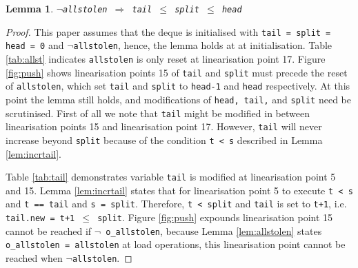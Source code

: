 \documentclass{sig-alternate-br}
\newtheorem{lemma}{Lemma}
\begin{document}
\begin{lemma}
	\texttt{$\neg$allstolen $\Rightarrow$ tail $\leq$ split $\leq$ head}
	\label{lem:allst.var}
\end{lemma}
\begin{proof}
	This paper assumes that the deque is initialised with \texttt{tail = split = head = 0} and \texttt{$\neg$allstolen}, hence, the lemma holds at at initialisation.
	Table \ref{tab:allst} indicates \texttt{allstolen} is only reset at linearisation point 17.
	Figure \ref{fig:push} shows linearisation points 15 of \texttt{tail} and \texttt{split} must precede the reset of \texttt{allstolen}, which set \texttt{tail} and \texttt{split} to \texttt{head-1} and \texttt{head} respectively.
	At this point the lemma still holds, and modifications of \texttt{head, tail,} and \texttt{split} need be scrutinised.
	First of all we note that \texttt{tail} might be modified in between linearisation points 15 and linearisation point 17.
	However, \texttt{tail} will never increase beyond \texttt{split} because of the condition \texttt{t < s} described in Lemma \ref{lem:incrtail}.
	
	Table \ref{tab:tail} demonstrates variable \texttt{tail} is modified at linearisation point 5 and 15.
	Lemma \ref{lem:incrtail} states that for linearisation point 5 to execute \texttt{t < s} and \texttt{t == tail} and \texttt{s = split}.
	Therefore, \texttt{t < split} and \texttt{tail} is set to \texttt{t+1}, i.e. \texttt{tail.new = t+1 $\leq$ split}.
	Figure \ref{fig:push} expounds linearisation point 15 cannot be reached if \texttt{$\neg$ o\_allstolen}, because Lemma \ref{lem:allstolen} states \texttt{o\_allstolen = allstolen} at load operations, this linearisation point cannot be reached when \texttt{$\neg$allstolen}.
	

\end{proof}
\end{document}
